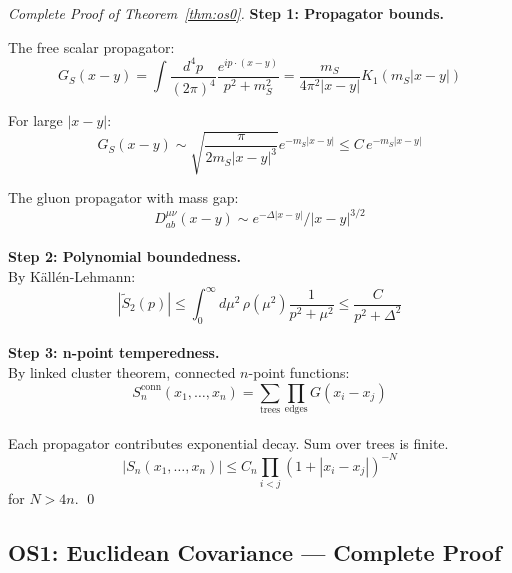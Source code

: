 \documentclass[11pt,a4paper]{article}
\theoremstyle{plain}
\theoremstyle{definition}
\begin{document}
\begin{proof}[Complete Proof of Theorem~\ref{thm:os0}]
\textbf{Step 1: Propagator bounds.}

The free scalar propagator:
\begin{equation}
G_S(x-y) = \int \frac{d^4p}{(2\pi)^4}\frac{e^{ip\cdot(x-y)}}{p^2 + m_S^2}
= \frac{m_S}{4\pi^2|x-y|} K_1(m_S|x-y|)
\end{equation}

For large $|x-y|$:
\begin{equation}
G_S(x-y) \sim \sqrt{\frac{\pi}{2m_S|x-y|^3}} e^{-m_S|x-y|} \leq C\, e^{-m_S|x-y|}
\end{equation}

The gluon propagator with mass gap:
\begin{equation}
D^{\mu\nu}_{ab}(x-y) \sim e^{-\Delta|x-y|}/|x-y|^{3/2}
\end{equation}
\\
\textbf{Step 2: Polynomial boundedness.}
\vspace{0.3em}\\
By Källén-Lehmann:
\begin{equation}
|\tilde{S}_2(p)| \leq \int_0^\infty d\mu^2\,\rho(\mu^2)\frac{1}{p^2+\mu^2}
\leq \frac{C}{p^2 + \Delta^2}
\end{equation}
\vspace{0.3em}\\
\textbf{Step 3: n-point temperedness.}
\vspace{0.3em}\\
By linked cluster theorem, connected $n$-point functions:
\begin{equation}
S_n^{\mathrm{conn}}(x_1,\ldots,x_n) = \sum_{\text{trees}} \prod_{\text{edges}} G(x_i - x_j)
\end{equation}
\vspace{0.3em}\\
Each propagator contributes exponential decay. Sum over trees is finite.
\begin{equation}
|S_n(x_1,\ldots,x_n)| \leq C_n \prod_{i<j} (1 + |x_i - x_j|)^{-N}
\end{equation}
for $N > 4n$. \qed
\end{proof}

\subsection{OS1: Euclidean Covariance --- Complete Proof}
\end{document}
